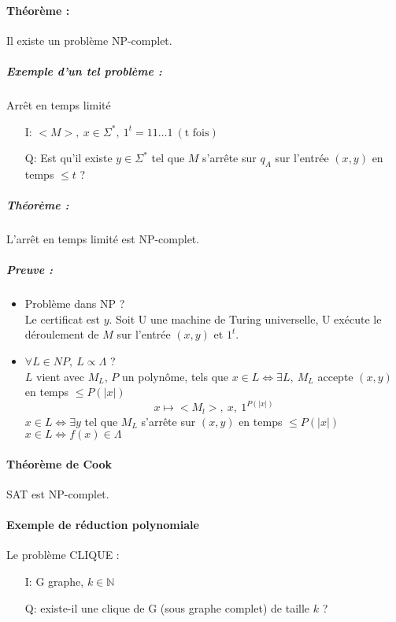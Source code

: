 \documentclass[12pt,a4paper]{report}
\begin{document}
\paragraph{Théorème :\\}
Il existe un problème NP-complet.
\subparagraph{Exemple d'un tel problème :} Arrêt en temps limité
\begin{itemize}
\item[I:] $<M>,\ x \in \Sigma^*,\ 1^t = 11\ldots1\ (\mbox{t fois})$
\item[Q:] Est qu'il existe $y \in \Sigma^*$ tel que $M$ s'arrête sur $q_A$ sur l'entrée $(x,y)$ en temps $\leqslant t$ ?
\end{itemize}
\subparagraph{Théorème :\\}
L'arrêt en temps limité est NP-complet.
\subparagraph{Preuve :\\}
\begin{itemize}
\item Problème dans NP ?\\
Le certificat est $y$. Soit U une machine de Turing universelle, U exécute le déroulement de $M$ sur l'entrée $(x,y)$ et $1^t$.
\item $\forall L \in NP,\ L \propto \Lambda $ ?\\
$L$ vient avec $M_L$, $P$ un polynôme, tels que $x \in L \Longleftrightarrow \exists L,\ M_L $ accepte $(x,y)$ en temps $\leqslant P(|x|)$
$$ x \longmapsto <M_l>,\ x,\ 1^{P(|x|)}$$
$x \in L \Longleftrightarrow \exists y$ tel que $M_L$ s'arrête sur $(x,y)$ en temps $\leqslant P(|x|)$\\
$ x \in L \Longleftrightarrow f(x) \in \Lambda $
\end{itemize}
\paragraph{Théorème de Cook\\}
SAT est NP-complet.
\paragraph{Exemple de réduction polynomiale \\}
Le problème CLIQUE :
\begin{itemize}
\item[I:]G graphe, $k \in \mathbb{N}$
\item[Q:]existe-il une clique de G (sous graphe complet) de taille $k$ ?
\end{itemize}
\begin{figure}[h]
	\centering
  \scalebox{0.8}{}
\end{figure}
\end{document}
